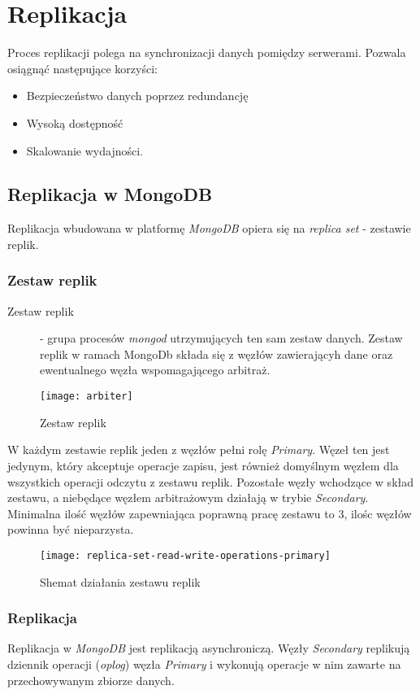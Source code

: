 \section{Replikacja}
Proces replikacji polega na synchronizacji danych pomiędzy serwerami. Pozwala osiągnąć następujące korzyści:
\begin{itemize}
	\item Bezpieczeństwo danych poprzez redundancję
	\item Wysoką dostępność
	\item Skalowanie wydajności.
\end{itemize}

\subsection{Replikacja w MongoDB}
Replikacja wbudowana w platformę \textit{MongoDB} opiera się na \textit{replica set} - zestawie replik.

\subsubsection{Zestaw replik}
\begin{description}
\item[Zestaw replik]
  - grupa procesów \textit{mongod} utrzymujących ten sam zestaw danych. Zestaw replik w ramach MongoDb składa się z węzłów zawierającyh dane oraz ewentualnego węzła wspomagającego arbitraż.
\end{description}

\begin{figure}[H]
	\centering
	\texttt{[image: arbiter]}
	\caption{Zestaw replik}
\end{figure}

W każdym zestawie replik jeden z węzłów pełni rolę \textit{Primary}. Węzeł ten jest jedynym, który akceptuje operacje zapisu, jest również domyślnym węzłem dla wszystkich operacji odczytu z zestawu replik. Pozostałe węzły wchodzące w skład zestawu, a niebędące węzłem arbitrażowym działają w trybie \textit{Secondary}. Minimalna ilość węzłów zapewniająca poprawną pracę zestawu to 3, ilośc węzłów powinna być nieparzysta.

\begin{figure}[H]
	\centering
		\texttt{[image: replica-set-read-write-operations-primary]}
	\caption{Shemat działania zestawu replik}
	\label{fig:test}
\end{figure}


\subsubsection{Replikacja} 
Replikacja w \textit{MongoDB} jest replikacją asynchroniczą. Węzły \textit{Secondary} replikują dziennik operacji (\textit{oplog}) węzła \textit{Primary} i wykonują operacje w nim zawarte na przechowywanym zbiorze danych.


